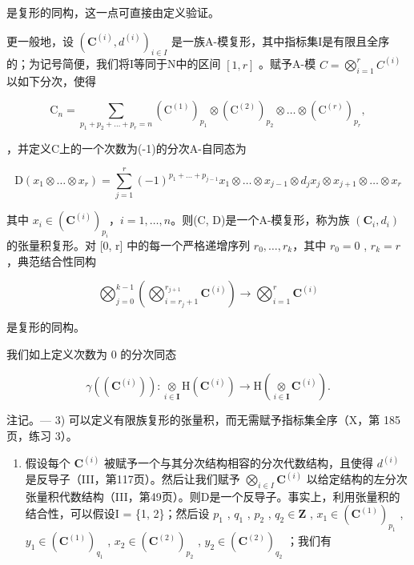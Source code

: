 是复形的同构，这一点可直接由定义验证。

更一般地，设 \((\mathbf{C}^{(i)}, d^{(i)})_{i \in I}\) 是一族A-模复形，其中指标集I是有限且全序的；为记号简便，我们将I等同于N中的区间 \([1, r]\) 。赋予A-模 \(C = \bigotimes_{i=1}^{r} C^{(i)}\) 以如下分次，使得

\[
\mathrm{C} _ {n} = \sum_ {p _ {1} + p _ {2} + \dots + p _ {r} = n} (\mathrm{C} ^ {(1)}) _ {p _ {1}} \otimes (\mathrm{C} ^ {(2)}) _ {p _ {2}} \otimes \dots \otimes (\mathrm{C} ^ {(r)}) _ {p _ {r}},
\]

，并定义C上的一个次数为(-1)的分次A-自同态为

\[
\mathrm{D} \left(x _ {1} \otimes \dots \otimes x _ {r}\right) = \sum_ {j = 1} ^ {r} (- 1) ^ {p _ {1} + \dots + p _ {j - 1}} x _ {1} \otimes \dots \otimes x _ {j - 1} \otimes d _ {j} x _ {j} \otimes x _ {j + 1} \otimes \dots \otimes x _ {r}
\]

其中 \(x_{i}\in (\mathbf{C}^{(i)})_{p_{i}}\)，\(i = 1,\dots,n\)。则(C, D)是一个A-模复形，称为族 \((\mathbf{C}_{i}, d_{i})\) 的张量积复形。对 [0, r] 中的每一个严格递增序列 \(r_{0}, \ldots, r_{k}\)，其中 \(r_{0} = 0\) , \(r_{k} = r\) ，典范结合性同构

\[
\bigotimes_ {j = 0} ^ {k - 1} \left(\bigotimes_ {i = r _ {j} + 1} ^ {r _ {j + 1}} \mathbf {C} ^ {(i)}\right)\rightarrow \bigotimes_ {i = 1} ^ {r} \mathbf {C} ^ {(i)}
\]

是复形的同构。

我们如上定义次数为 0 的分次同态

\[
\gamma ((\mathbf {C} ^ {(i)})): \underset {i \in \mathbf {I}} {\otimes} \mathrm{H} (\mathbf {C} ^ {(i)}) \to \mathrm{H} \left(\underset {i \in \mathbf {I}} {\otimes} \mathbf {C} ^ {(i)}\right) .
\]

注记。--- 3) 可以定义有限族复形的张量积，而无需赋予指标集全序（X，第 185 页，练习 3）。

\begin{enumerate}
\def\labelenumi{\arabic{enumi})}
\setcounter{enumi}{3}
\tightlist
\item
  假设每个 \(\mathbf{C}^{(i)}\) 被赋予一个与其分次结构相容的分次代数结构，且使得 \(d^{(i)}\) 是反导子（III，第117页）。然后让我们赋予 \(\bigotimes_{i\in I}\mathbf{C}^{(i)}\) 以给定结构的左分次张量积代数结构（III，第49页）。则D是一个反导子。事实上，利用张量积的结合性，可以假设I = \{1, 2\}；然后设 \(p_1\) , \(q_1\) , \(p_2\) , \(q_2 \in \mathbf{Z}\) , \(x_1 \in (\mathbf{C}^{(1)})_{p_1}\) , \(y_1 \in (\mathbf{C}^{(1)})_{q_1}\) , \(x_2 \in (\mathbf{C}^{(2)})_{p_2}\) , \(y_2 \in (\mathbf{C}^{(2)})_{q_2}\) ；我们有
\end{enumerate}

